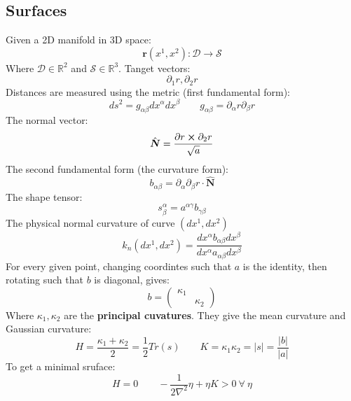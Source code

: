 \documentclass[twocolumn]{article}
\newcommand{\R}{\ensuremath{\mathbb{R}}}
\begin{document}
\subsection{Surfaces}
Given a 2D manifold in 3D space:
\begin{equation}
    \boldsymbol{r}(x^1, x^2): \mathcal{D}\rightarrow\mathcal{S}
\end{equation}
Where $\mathcal{D} \in \R^2$ and $\mathcal{S} \in \R^3$.
\newline
Tanget vectors:
\begin{equation}
    \partial_1 r, \partial_2 r
\end{equation}
Distances are measured using the metric (first fundamental form):
\begin{equation}
    ds^2 = g_{\alpha\beta}dx^\alpha dx^\beta
    \qquad
    g_{\alpha\beta} = \partial_\alpha r \partial_\beta r
\end{equation}
The normal vector:
\begin{equation}
    \hat{\boldsymbol{N}} = \frac{\partial r \cross \partial_2 r}{\sqrt{a}}
\end{equation}
The second fundamental form (the curvature form):
\begin{equation}
    b_{\alpha\beta} = \partial_\alpha \partial_\beta r \cdot \hat{\boldsymbol{N}}
\end{equation}
The shape tensor:
\begin{equation}
    s^\alpha_\beta = a^{\alpha\gamma}b_{\gamma\beta}
\end{equation}
The physical normal curvature of curve $(dx^1, dx^2)$
\begin{equation}
    k_n(dx^1, dx^2) = \frac{dx^\alpha b_{\alpha\beta}dx^\beta}{dx^\alpha a_{\alpha\beta}dx^\beta}
\end{equation}
For every given point, changing coordintes such that $a$ is the identity, then rotating such that $b$ is diagonal, gives:
\begin{equation}
    b = \begin{pmatrix}
        \kappa_1 & \\ & \kappa_2
    \end{pmatrix}
\end{equation}
Where $\kappa_1, \kappa_2$ are the \textbf{principal cuvatures}. They give the mean curvature and Gaussian curvature:
\begin{equation}
    H = \frac{\kappa_1 + \kappa_2}{2} = \frac{1}{2}Tr(s)
    \qquad
    K = \kappa_1\kappa_2 = |s| = \frac{|b|}{|a|}
\end{equation}
To get a minimal sruface:
\begin{equation}
    H = 0
    \qquad
    -\frac{1}{2\nabla^2}\eta + \eta K > 0 \ \forall \ \eta
\end{equation}
\end{document}
